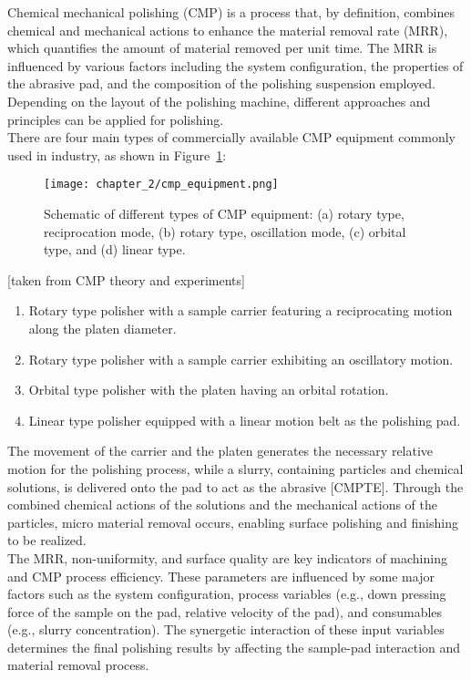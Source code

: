 Chemical mechanical polishing (CMP) is a process that, by definition, combines chemical and mechanical actions to enhance the material removal rate (MRR), which quantifies the amount of material removed per unit time. The MRR is influenced by various factors including the system configuration, the properties of the abrasive pad, and the composition of the polishing suspension employed.
\\
Depending on the layout of the polishing machine, different approaches and principles can be applied for polishing.
\\
There are four main types of commercially available CMP equipment commonly used in industry, as shown in Figure~\ref{fig:cmp_equipment}: 
\begin{figure}[H]
    \centering
    \texttt{[image: chapter\_2/cmp\_equipment.png]}
    \caption[Schematic of different types of CMP equipment.]{ Schematic of different types of CMP equipment: (a) rotary type, reciprocation mode, (b) rotary type, oscillation mode, (c) orbital type, and (d) linear type.}
    \label{fig:cmp_equipment}
\end{figure}
[taken from CMP theory and experiments]

\begin{enumerate}
    \item Rotary type polisher with a sample carrier featuring a reciprocating motion along the platen diameter.
    \item Rotary type polisher with a sample carrier exhibiting an oscillatory motion.
    \item Orbital type polisher with the platen having an orbital rotation.
    \item Linear type polisher equipped with a linear motion belt as the polishing pad.
\end{enumerate}
The movement of the carrier and the platen generates the necessary relative motion for the polishing process, while a slurry, containing particles and chemical solutions, is delivered onto the pad to act as the abrasive [CMPTE]. Through the combined chemical actions of the solutions and the mechanical actions of the particles, micro material removal occurs, enabling surface polishing and finishing to be realized.
\\
The MRR, non-uniformity, and surface quality are key indicators of machining and CMP process efficiency. These parameters are influenced by some major factors such as the system configuration, process variables (e.g., down pressing force of the sample on the pad, relative velocity of the pad), and consumables (e.g., slurry concentration). The synergetic interaction of these input variables determines the final polishing results by affecting the sample-pad interaction and material removal process. 

